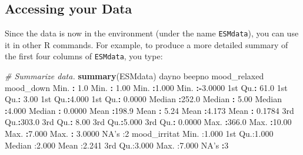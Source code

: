 \documentclass[]{book}
\newenvironment{Shaded}{\begin{snugshade}}{\end{snugshade}}
\newcommand{\KeywordTok}[1]{\textcolor[rgb]{0.13,0.29,0.53}{\textbf{#1}}}
\newcommand{\DecValTok}[1]{\textcolor[rgb]{0.00,0.00,0.81}{#1}}
\newcommand{\FloatTok}[1]{\textcolor[rgb]{0.00,0.00,0.81}{#1}}
\newcommand{\StringTok}[1]{\textcolor[rgb]{0.31,0.60,0.02}{#1}}
\newcommand{\CommentTok}[1]{\textcolor[rgb]{0.56,0.35,0.01}{\textit{#1}}}
\newcommand{\OperatorTok}[1]{\textcolor[rgb]{0.81,0.36,0.00}{\textbf{#1}}}
\newcommand{\NormalTok}[1]{#1}
\begin{document}
\subsection{Accessing your Data}\label{accessing-your-data}


Since the data is now in the environment (under the name
\texttt{ESMdata}), you can use it in other R commands. For example, to
produce a more detailed summary of the first four columns of
\texttt{ESMdata}, you type:

\begin{Shaded}
\begin{Highlighting}[]
\CommentTok{# Summarize data.}
\KeywordTok{summary}\NormalTok{(ESMdata)}
\NormalTok{     dayno           beepno       mood_relaxed     mood_down      }
\NormalTok{ Min.   }\OperatorTok{:}\StringTok{  }\FloatTok{1.0}\NormalTok{   Min.   }\OperatorTok{:}\StringTok{ }\FloatTok{1.00}\NormalTok{   Min.   }\OperatorTok{:}\FloatTok{1.000}\NormalTok{   Min.   }\OperatorTok{:-}\FloatTok{3.0000}  
\NormalTok{ 1st Qu.}\OperatorTok{:}\StringTok{ }\FloatTok{61.0}\NormalTok{   1st Qu.}\OperatorTok{:}\StringTok{ }\FloatTok{3.00}\NormalTok{   1st Qu.}\OperatorTok{:}\FloatTok{4.000}\NormalTok{   1st Qu.}\OperatorTok{:}\StringTok{ }\FloatTok{0.0000}  
\NormalTok{ Median }\OperatorTok{:}\FloatTok{252.0}\NormalTok{   Median }\OperatorTok{:}\StringTok{ }\FloatTok{5.00}\NormalTok{   Median }\OperatorTok{:}\FloatTok{4.000}\NormalTok{   Median }\OperatorTok{:}\StringTok{ }\FloatTok{0.0000}  
\NormalTok{ Mean   }\OperatorTok{:}\FloatTok{198.9}\NormalTok{   Mean   }\OperatorTok{:}\StringTok{ }\FloatTok{5.24}\NormalTok{   Mean   }\OperatorTok{:}\FloatTok{4.173}\NormalTok{   Mean   }\OperatorTok{:}\StringTok{ }\FloatTok{0.1784}  
\NormalTok{ 3rd Qu.}\OperatorTok{:}\FloatTok{303.0}\NormalTok{   3rd Qu.}\OperatorTok{:}\StringTok{ }\FloatTok{8.00}\NormalTok{   3rd Qu.}\OperatorTok{:}\FloatTok{5.000}\NormalTok{   3rd Qu.}\OperatorTok{:}\StringTok{ }\FloatTok{0.0000}  
\NormalTok{ Max.   }\OperatorTok{:}\FloatTok{366.0}\NormalTok{   Max.   }\OperatorTok{:}\FloatTok{10.00}\NormalTok{   Max.   }\OperatorTok{:}\FloatTok{7.000}\NormalTok{   Max.   }\OperatorTok{:}\StringTok{ }\FloatTok{3.0000}  
\NormalTok{                                                 NA}\StringTok{'s   :2        }
\StringTok{  mood_irritat  }
\StringTok{ Min.   :1.000  }
\StringTok{ 1st Qu.:1.000  }
\StringTok{ Median :2.000  }
\StringTok{ Mean   :2.241  }
\StringTok{ 3rd Qu.:3.000  }
\StringTok{ Max.   :7.000  }
\StringTok{ NA'}\NormalTok{s   }\OperatorTok{:}\DecValTok{3}      
\end{Highlighting}
\end{Shaded}
\end{document}
